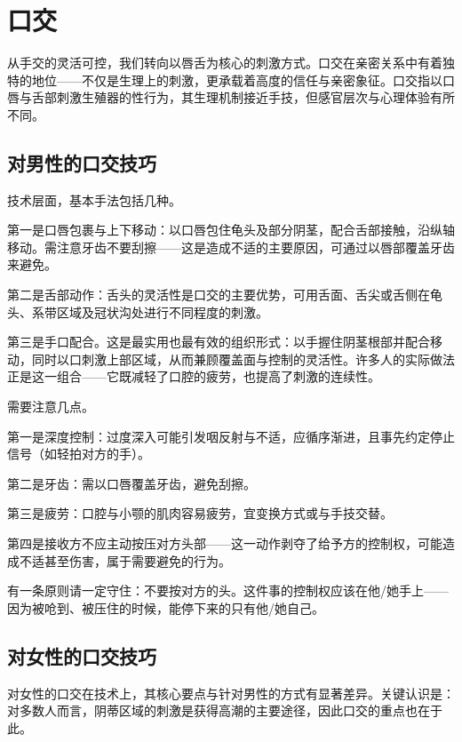 \documentclass[12pt,UTF8]{ctexbook}
\begin{document}
\chapter{口交}

从手交的灵活可控，我们转向以唇舌为核心的刺激方式。口交在亲密关系中有着独特的地位——不仅是生理上的刺激，更承载着高度的信任与亲密象征。口交指以口唇与舌部刺激生殖器的性行为，其生理机制接近手技，但感官层次与心理体验有所不同。

\section{对男性的口交技巧}

技术层面，基本手法包括几种。

第一是口唇包裹与上下移动：以口唇包住龟头及部分阴茎，配合舌部接触，沿纵轴移动。需注意牙齿不要刮擦——这是造成不适的主要原因，可通过以唇部覆盖牙齿来避免。

第二是舌部动作：舌头的灵活性是口交的主要优势，可用舌面、舌尖或舌侧在龟头、系带区域及冠状沟处进行不同程度的刺激。

第三是手口配合。这是最实用也最有效的组织形式：以手握住阴茎根部并配合移动，同时以口刺激上部区域，从而兼顾覆盖面与控制的灵活性。许多人的实际做法正是这一组合——它既减轻了口腔的疲劳，也提高了刺激的连续性。

需要注意几点。

第一是深度控制：过度深入可能引发咽反射与不适，应循序渐进，且事先约定停止信号（如轻拍对方的手）。

第二是牙齿：需以口唇覆盖牙齿，避免刮擦。

第三是疲劳：口腔与小颚的肌肉容易疲劳，宜变换方式或与手技交替。

第四是接收方不应主动按压对方头部——这一动作剥夺了给予方的控制权，可能造成不适甚至伤害，属于需要避免的行为。

\begin{tcolorbox}[colback=pink!5!white,colframe=red!50!black,title=贴心小叮咛]
有一条原则请一定守住：不要按对方的头。这件事的控制权应该在他/她手上——因为被呛到、被压住的时候，能停下来的只有他/她自己。
\end{tcolorbox}

\section{对女性的口交技巧}

对女性的口交在技术上，其核心要点与针对男性的方式有显著差异。关键认识是：对多数人而言，阴蒂区域的刺激是获得高潮的主要途径，因此口交的重点也在于此。
\end{document}
